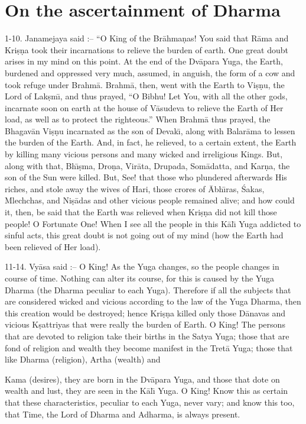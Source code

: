\chapter{On the ascertainment of Dharma}

1-10. Janamejaya said :-- ``O King of the Br\=ahma\d{n}as! You said that R\=ama and Kri\d{s}\d{n}a took their incarnations to relieve the burden of earth. One great doubt arises in my mind on this point. At the end of the Dv\=apara Yuga, the Earth, burdened and oppressed very much, assumed, in anguish, the form of a cow and took refuge under Brahm\=a. Brahm\=a, then, went with the Earth to Vi\d{s}\d{n}u, the Lord of Lak\d{s}m\={\i}, and thus prayed, ``O Bibhu! Let You, with all the other gods, incarnate soon on earth at the house of V\=asudeva to relieve the Earth of Her load, as well as to protect the righteous.'' When Brahm\=a thus prayed, the Bhagav\=an Vi\d{s}\d{n}u incarnated as the son of Devak\={\i}, along with Balar\=ama to lessen the burden of the Earth. And, in fact, he relieved, to a certain extent, the Earth by killing many vicious persons and many wicked and irreligious Kings. But, along with that, Bh\={\i}\d{s}ma, Dro\d{n}a, Vir\=ata, Drupada, Som\=adatta, and Kar\d{n}a, the son of the Sun were killed. But, See! that those who plundered afterwards His riches, and stole away the wives of Hari, those crores of \=Abh\={\i}ras, \'Sakas, Mlechchas, and Ni\d{s}\=adas and other vicious people remained alive; and how could it, then, be said that the Earth was relieved when Kri\d{s}\d{n}a did not kill those people! O Fortunate One! When I see all the people in this K\=al\={\i} Yuga addicted to sinful acts, this great doubt is not going out of my mind (how the Earth had been relieved of Her load).

11-14. Vy\=asa said :-- O King! As the Yuga changes, so the people changes in course of time. Nothing can alter its course, for this is caused by the Yuga Dharma (the Dharma peculiar to each Yuga). Therefore if all the subjects that are considered wicked and vicious according to the law of the Yuga Dharma, then this creation would be destroyed; hence Kri\d{s}\d{n}a killed only those D\=anavas and vicious K\d{s}attriyas that were really the burden of Earth. O King! The persons that are devoted to religion take their births in the Satya Yuga; those that are fond of religion and wealth they become manifest in the Tret\=a Yuga; those that like Dharma (religion), Artha (wealth) and

Kama (desires), they are born in the Dv\=apara Yuga, and those that dote on wealth and lust, they are seen in the K\=al\={\i} Yuga. O King! Know this as certain that these characteristics, peculiar to each Yuga, never vary; and know this too, that Time, the Lord of Dharma and Adharma, is always present.

